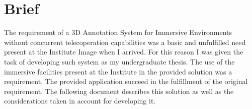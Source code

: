
\chapter{Brief}
The requirement of a 3D Annotation System for Immersive Environments without concurrent telecoperation capabilities was a basic and unfulfilled need present at the Institute Image when I arrived. For this reason I was given the task of developing such system as my undergraduate thesis. The use of the immersive facilities present at the Institute in the provided solution was a requirement. The provided application succeed in the fulfillment of the original requirement. The following document describes this solution as well as the considerations taken in account for developing it.